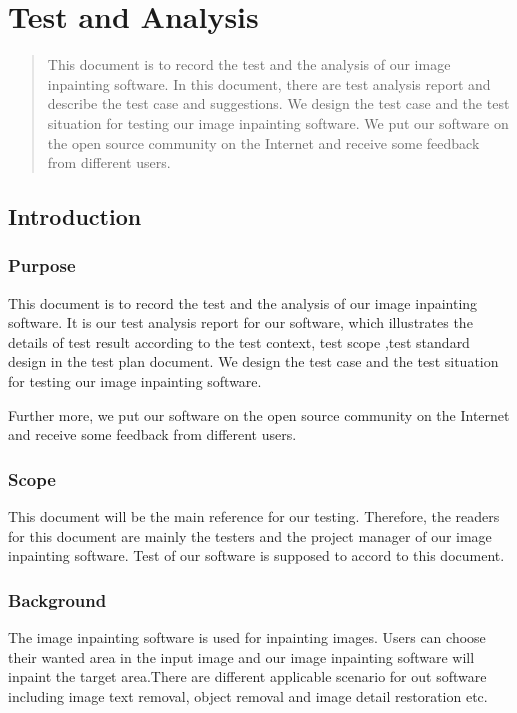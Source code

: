 \chapter{Test and Analysis}
\begin{abstract}
\qquad This document is to record the test and the analysis of our image inpainting software. In this document, there are test analysis report and describe the test case and suggestions. We design the test case and the test situation for testing our image inpainting software. We put our software on the open source community on the Internet and receive some feedback from different users.
\end{abstract}
\begin{center}
\end{center}

\section{Introduction}
\subsection{Purpose}
\qquad This document is to record the test and the analysis of our image inpainting software. It is our test analysis report for our software, which illustrates the details of test result according to the test context, test scope ,test standard design in the test plan document. We design the test case and the test situation for testing our image inpainting software.

Further more, we put our software on the open source community on the Internet and receive some feedback from different users.
\subsection{Scope}
\qquad This document will be the main reference for our testing. Therefore, the readers for this document are mainly the testers and the project manager of our image inpainting software. Test of our software is supposed to accord to this document.
\subsection{Background}
\qquad The image inpainting software is used for inpainting images. Users can choose their wanted area in the input image and our image inpainting software will inpaint the target area.There are different applicable scenario for out software including image text removal, object removal and image detail restoration etc. 

